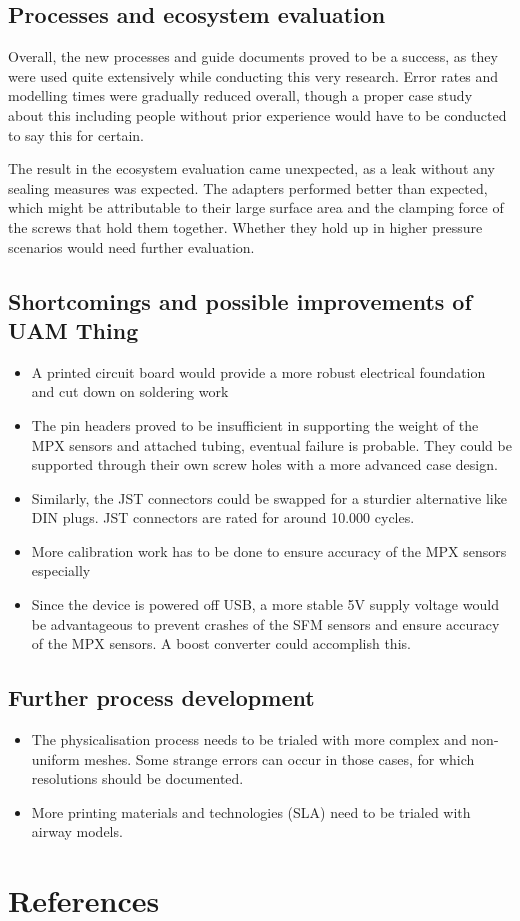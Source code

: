 \documentclass[MME,Projekt,english]{twbook}%
\newcommand{\listofcode}{\phantomsection\lstlistoflistings}
\begin{document}
\section{Processes and ecosystem evaluation}

Overall, the new processes and guide documents proved to be a success, as they were used quite extensively while conducting
this very research. Error rates and modelling times were gradually reduced overall, though a proper case study about this
including people without prior experience would have to be conducted to say this for certain.

The result in the ecosystem evaluation came unexpected, as a leak without any sealing measures was expected. The adapters performed
better than expected, which might be attributable to their large surface area and the clamping force of the screws that hold them together. Whether
they hold up in higher pressure scenarios would need further evaluation.

\section{Shortcomings and possible improvements of UAM Thing}

\begin{itemize}
	\item A printed circuit board would provide a more robust electrical foundation and cut down on soldering work
	\item The pin headers proved to be insufficient in supporting the weight of the MPX sensors and attached tubing, eventual failure is probable.
		  They could be supported through their own screw holes with a more advanced case design.
	\item Similarly, the JST connectors could be swapped for a sturdier alternative like DIN plugs. JST connectors are rated for around 10.000 cycles.
	\item More calibration work has to be done to ensure accuracy of the MPX sensors especially
	\item Since the device is powered off USB, a more stable 5V supply voltage would be advantageous to prevent crashes of the SFM sensors and ensure accuracy of the MPX sensors. A boost converter could accomplish this.
\end{itemize}
\section{Further process development}
\begin{itemize}
	\item The physicalisation process needs to be trialed with more complex and non-uniform meshes. Some strange errors can occur in those cases,
		  for which resolutions should be documented.
	\item More printing materials and technologies (SLA) need to be trialed with airway models.
\end{itemize}

\newpage
\chapter{References}

\printbibliography[heading=none]

\clearpage
\listoffigures

\listoftables

\listofcode
\end{document}
